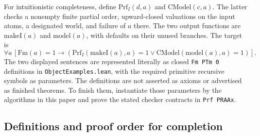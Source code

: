For intuitionistic completeness, define $\mathrm{Prf}_I(d,a)$ and
$\mathrm{CModel}(c,a)$. The latter checks a nonempty finite partial order,
upward-closed valuations on the input atoms, a designated world, and
failure of $a$ there. The two output functions are $\mathrm{makeI}(a)$
and $\mathrm{model}(a)$, with defaults on their unused branches. The target is
\[
 \forall a\,[\mathrm{Fm}(a)=1\to
   (\mathrm{Prf}_I(\mathrm{makeI}(a),a)=1
       \vee\mathrm{CModel}(\mathrm{model}(a),a)=1)].
\]
The two displayed sentences are represented literally as closed
\texttt{Fm PTm 0} definitions in \texttt{ObjectExamples.lean}, with the
required primitive recursive symbols as parameters. The definitions are
not asserted as axioms or advertised as finished theorems. To finish
them, instantiate those parameters by the algorithms in this paper and
prove the stated checker contracts in \texttt{Prf PRAAx}.

\subsection{Definitions and proof order for completion}


